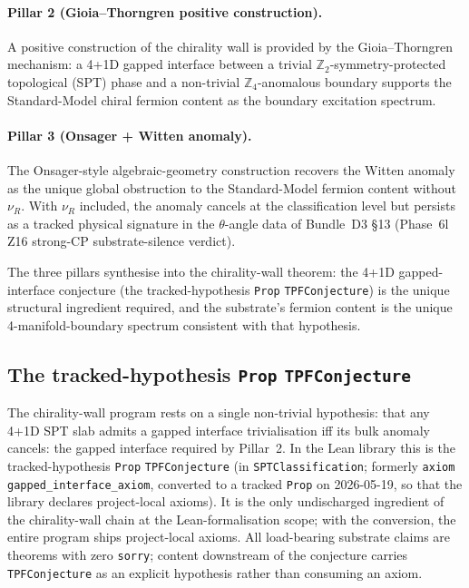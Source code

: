 \documentclass[aps,prd,reprint,nofootinbib,superscriptaddress]{revtex4-2}
\begin{document}
\paragraph{Pillar 2 (Gioia--Thorngren positive construction).} A
positive construction of the chirality wall is provided by the
Gioia--Thorngren mechanism: a 4+1D gapped interface between a trivial
$\mathbb{Z}_2$-symmetry-protected topological (SPT) phase and a
non-trivial $\mathbb{Z}_4$-anomalous boundary supports the
Standard-Model chiral fermion content as the boundary excitation
spectrum.

\paragraph{Pillar 3 (Onsager + Witten anomaly).} The Onsager-style
algebraic-geometry construction recovers the Witten anomaly as the
unique global obstruction to the Standard-Model fermion content
without $\nu_R$. With $\nu_R$ included, the anomaly cancels at the
classification level but persists as a tracked physical signature in
the $\theta$-angle data of Bundle~D3 \S 13 (Phase~6l Z16 strong-CP
substrate-silence verdict).

The three pillars synthesise into the chirality-wall theorem: the
4+1D gapped-interface conjecture (the tracked-hypothesis
\texttt{Prop} \texttt{TPFConjecture}) is
the unique structural ingredient required, and the substrate's
fermion content is the unique 4-manifold-boundary spectrum consistent
with that hypothesis.

\subsection{The tracked-hypothesis \texttt{Prop} \texttt{TPFConjecture}}

The chirality-wall program rests on a single non-trivial hypothesis:
that any 4+1D SPT slab admits a gapped interface trivialisation iff
its bulk anomaly cancels: the gapped interface required by
Pillar~2. In the Lean library this is the tracked-hypothesis
\texttt{Prop} \texttt{TPFConjecture} (in \texttt{SPTClassification};
formerly \texttt{axiom gapped\_interface\_axiom}, converted to a
tracked \texttt{Prop} on 2026-05-19, so that the library declares
\axiomcount{} project-local axioms). It is the only undischarged
ingredient of the chirality-wall chain at the Lean-formalisation
scope; with the conversion, the entire program ships
\axiomcount{} project-local axioms. All load-bearing substrate claims
are theorems with zero \texttt{sorry}; content downstream of the
conjecture carries \texttt{TPFConjecture} as an explicit hypothesis
rather than consuming an axiom.
\end{document}
